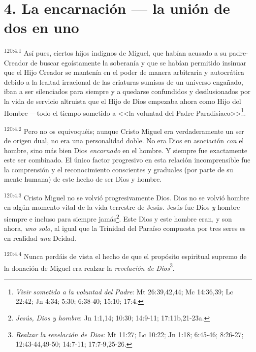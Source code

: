\section*{4. La encarnación --- la unión de dos en uno}
\par 
\textsuperscript{120:4.1} Así pues, ciertos hijos indignos de Miguel, que habían acusado a su padre-Creador de buscar egoístamente la soberanía y que se habían permitido insinuar que el Hijo Creador se mantenía en el poder de manera arbitraria y autocrática debido a la lealtad irracional de las criaturas sumisas de un universo engañado, iban a ser silenciados para siempre y a quedarse confundidos y desilusionados por la vida de servicio altruista que el Hijo de Dios empezaba ahora como Hijo del Hombre ---todo el tiempo sometido a <<la voluntad del Padre Paradisiaco>>\footnote{\textit{Vivir sometido a la voluntad del Padre}: Mt 26:39,42,44; Mc 14:36,39; Lc 22:42; Jn 4:34; 5:30; 6:38-40; 15:10; 17:4.}.

\par 
\textsuperscript{120:4.2} Pero no os equivoquéis; aunque Cristo Miguel era verdaderamente un ser de origen dual, no era una personalidad doble. No era Dios en asociación \textit{con} el hombre, sino más bien Dios \textit{encarnado} en el hombre. Y siempre fue exactamente este ser combinado. El único factor progresivo en esta relación incomprensible fue la comprensión y el reconocimiento conscientes y graduales (por parte de su mente humana) de este hecho de ser Dios y hombre.

\par 
\textsuperscript{120:4.3} Cristo Miguel no se volvió progresivamente Dios. Dios no se volvió hombre en algún momento vital de la vida terrestre de Jesús. Jesús fue Dios \textit{y} hombre ---siempre e incluso para siempre jamás\footnote{\textit{Jesús, Dios y hombre}: Jn 1:1,14; 10:30; 14:9-11; 17:11b,21-23a.}. Este Dios y este hombre eran, y son ahora, \textit{uno solo}, al igual que la Trinidad del Paraíso compuesta por tres seres es en realidad \textit{una} Deidad.

\par 
\textsuperscript{120:4.4} Nunca perdáis de vista el hecho de que el propósito espiritual supremo de la donación de Miguel era realzar la \textit{revelación de Dios}\footnote{\textit{Realzar la revelación de Dios}: Mt 11:27; Lc 10:22; Jn 1:18; 6:45-46; 8:26-27; 12:43-44,49-50; 14:7-11; 17:7-9,25-26.}.

